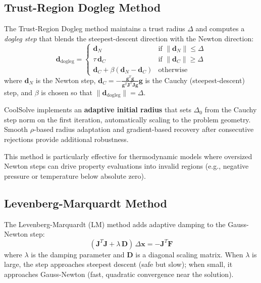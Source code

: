 \documentclass[review,3p]{elsarticle}
\begin{document}
\subsection{Trust-Region Dogleg Method}

The Trust-Region Dogleg method \cite{Nocedal2006} maintains a trust radius $\Delta$ and computes a \emph{dogleg step} that blends the steepest-descent direction with the Newton direction:
\begin{equation}
    \mathbf{d}_{\text{dogleg}} = \begin{cases}
        \mathbf{d}_N & \text{if } \|\mathbf{d}_N\| \leq \Delta \\
        \tau \, \mathbf{d}_C & \text{if } \|\mathbf{d}_C\| \geq \Delta \\
        \mathbf{d}_C + \beta(\mathbf{d}_N - \mathbf{d}_C) & \text{otherwise}
    \end{cases}
\end{equation}
where $\mathbf{d}_N$ is the Newton step, $\mathbf{d}_C = -\frac{\mathbf{g}^T\mathbf{g}}{\mathbf{g}^T\mathbf{J}^T\mathbf{J}\mathbf{g}}\mathbf{g}$ is the Cauchy (steepest-descent) step, and $\beta$ is chosen so that $\|\mathbf{d}_{\text{dogleg}}\| = \Delta$.

CoolSolve implements an \textbf{adaptive initial radius} that sets $\Delta_0$ from the Cauchy step norm on the first iteration, automatically scaling to the problem geometry. Smooth $\rho$-based radius adaptation and gradient-based recovery after consecutive rejections provide additional robustness.

This method is particularly effective for thermodynamic models where oversized Newton steps can drive property evaluations into invalid regions (e.g., negative pressure or temperature below absolute zero).

\subsection{Levenberg-Marquardt Method}

The Levenberg-Marquardt (LM) method \cite{Madsen2004} adds adaptive damping to the Gauss-Newton step:
\begin{equation}
    (\mathbf{J}^T\mathbf{J} + \lambda \, \mathbf{D}) \, \Delta\mathbf{x} = -\mathbf{J}^T\mathbf{F}
\end{equation}
where $\lambda$ is the damping parameter and $\mathbf{D}$ is a diagonal scaling matrix. When $\lambda$ is large, the step approaches steepest descent (safe but slow); when small, it approaches Gauss-Newton (fast, quadratic convergence near the solution).
\end{document}

